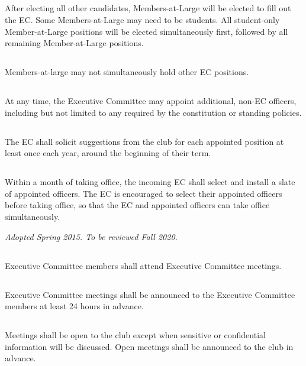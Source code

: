 \documentclass{bylaws}
\newcommand{\sptimes}[2]{\emph{Adopted #1. To be reviewed #2.}}
\begin{document}
\subsection{}After electing all other candidates, Members-at-Large will be elected to fill out the EC. Some Members-at-Large may need to be students. All student-only Member-at-Large positions will be elected simultaneously first, followed by all remaining Member-at-Large positions.
\subsection{}Members-at-large may not simultaneously hold other EC positions.


\subsection{}At any time, the Executive Committee may appoint additional, non-EC officers, including but not limited to any required by the constitution or standing policies.
\subsection{}The EC shall solicit suggestions from the club for each appointed position at least once each year, around the beginning of their term.
\subsection{}Within a month of taking office, the incoming EC shall select and install a slate of appointed officers. The EC is encouraged to select their appointed officers before taking office, so that the EC and appointed officers can take office simultaneously.


\sptimes{Spring 2015}{Fall 2020}


\subsection{}Executive Committee members shall attend Executive Committee meetings.
\subsection{}Executive Committee meetings shall be announced to the Executive Committee members at least 24 hours in advance.
\subsection{}Meetings shall be open to the club except when sensitive or confidential information will be discussed. Open meetings shall be announced to the club in advance.
\end{document}
